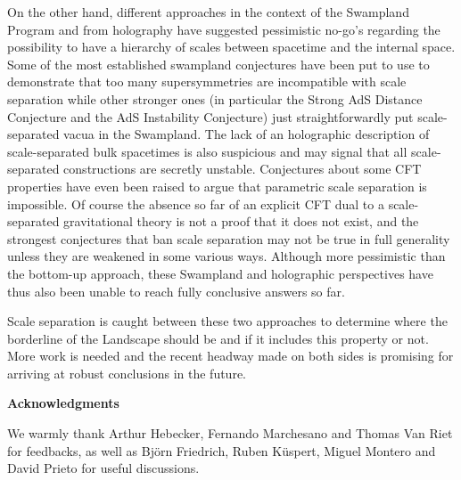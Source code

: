 \documentclass[11pt, a4paper]{article}
\begin{document}
On the other hand, different approaches in the context of the Swampland Program and from holography have suggested pessimistic no-go's regarding the possibility to have a hierarchy of scales between spacetime and the internal space. Some of the most established swampland conjectures have been put to use to demonstrate that too many supersymmetries are incompatible with scale separation while other stronger ones (in particular the Strong AdS Distance Conjecture and the AdS Instability Conjecture) just straightforwardly put scale-separated vacua in the Swampland. The lack of an holographic description of scale-separated bulk spacetimes is also suspicious and may signal that all scale-separated constructions are secretly unstable. Conjectures about some CFT properties have even been raised to argue that parametric scale separation is impossible. Of course the absence so far of an explicit CFT dual to a scale-separated gravitational theory is not a proof that it does not exist, and the strongest conjectures that ban scale separation may not be true in full generality unless they are weakened in some various ways. Although more pessimistic than the bottom-up approach, these Swampland and holographic perspectives have thus also been unable to reach fully conclusive answers so far.

Scale separation is caught between these two approaches to determine where the borderline of the Landscape should be and if it includes this property or not. More work is needed and the recent headway made on both sides is promising for arriving at robust conclusions in the future.

\bigskip
\bigskip

\centerline{\bf  Acknowledgments}

\vspace*{.5cm}

We warmly thank Arthur Hebecker, Fernando Marchesano and Thomas Van Riet for feedbacks, as well as Björn Friedrich, Ruben Küspert, Miguel Montero and David Prieto for useful discussions.


\end{document}
